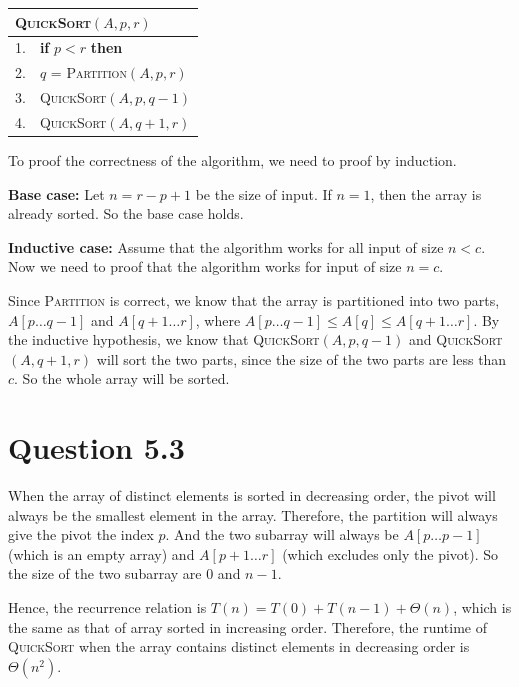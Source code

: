 \documentclass[a4paper,12pt]{article}
\begin{document}
\begin{center}
	\begin{tabular}{ll}
		\toprule
		\multicolumn{2}{l}{\textsc{QuickSort}$(A,p,r)$}\\
		\midrule
		1. & \textbf{if} $p<r$ \textbf{then}\\
		2. & \qquad $q$ = \textsc{Partition}$(A,p,r)$\\
		3. & \qquad \textsc{QuickSort}$(A,p,q-1)$\\
		4. & \qquad \textsc{QuickSort}$(A,q+1,r)$\\
		\bottomrule
	\end{tabular}
\end{center}

To proof the correctness of the algorithm, we need to proof by induction.

\textbf{Base case:} Let $n = r - p + 1$ be the size of input. 
If $n = 1$, then the array is already sorted.
So the base case holds.

\textbf{Inductive case:} Assume that the algorithm works for all input of size $n < c$.
Now we need to proof that the algorithm works for input of size $n = c$.

Since \textsc{Partition} is correct, we know that the array is partitioned into two parts, $A[p\dots q-1]$ and $A[q+1\dots r]$, where $A[p\dots q-1] \leq A[q] \leq A[q+1\dots r]$.
By the inductive hypothesis, we know that \textsc{QuickSort}$(A,p,q-1)$ and \textsc{QuickSort}$(A,q+1,r)$ will sort the two parts, since the size of the two parts are less than $c$.
So the whole array will be sorted.

\section*{Question 5.3}

When the array of distinct elements is sorted in decreasing order, the pivot will always be the smallest element in the array.
Therefore, the partition will always give the pivot the index $p$.
And the two subarray will always be $A[p\dots p - 1]$ (which is an empty array) and $A[p + 1\dots r]$ (which excludes only the pivot).
So the size of the two subarray are $0$ and $n - 1$.

Hence, the recurrence relation is $T(n) = T(0) + T(n - 1) + \Theta(n)$, which is the same as that of array sorted in increasing order.
Therefore, the runtime of \textsc{QuickSort} when the array contains distinct elements in decreasing order is $\Theta(n^2)$.
\end{document}
